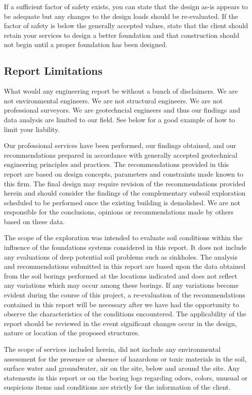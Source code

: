 \documentclass[12pt]{article}
\begin{document}
If a sufficient factor of safety exists, you can state that the design as-is appears to be adequate but any changes to the design loads should be re-evaluated. If the factor of safety is below the generally accepted values, state that the client should retain your services to design a better foundation and that construction should not begin until a proper foundation has been designed.

\subsection{Report Limitations}
What would any engineering report be without a bunch of disclaimers. We are not environmental engineers. We are not structural engineers. We are not professional surveyors. We are geotechncial engineers and thus our findings and data analysis are limited to our field. See below for a good example of how to limit your liability.

\begin{letter}
Our professional services have been performed, our findings obtained, and our recommendations prepared in accordance with generally accepted geotechnical engineering principles and practices.  The recommendations provided in this report are based on design concepts, parameters and constraints made known to this firm.  The final design may require revision of the recommendations provided herein and should consider the findings of the complementary subsoil exploration scheduled to be performed once the existing building is demolished.  We are not responsible for the conclusions, opinions or recommendations made by others based on these data.

The scope of the exploration was intended to evaluate soil conditions within the influence of the foundations systems considered in this report. It does not include any evaluations of deep potential soil problems such as sinkholes.  The analysis and recommendations submitted in this report are based upon the data obtained from the soil borings performed at the locations indicated and does not reflect any variations which may occur among these borings.  If any variations become evident during the course of this project, a re-evaluation of the recommendations contained in this report will be necessary after we have had the opportunity to observe the characteristics of the conditions encountered.  The applicability of the report should be reviewed in the event significant changes occur in the design, nature or location of the proposed structures.

The scope of services included herein, did not include any environmental assessment for the presence or absence of hazardous or toxic materials in the soil, surface water and groundwater, air on the site, below and around the site.  Any statements in this report or on the boring logs regarding odors, colors, unusual or suspicious items and conditions are strictly for the information of the client.
\end{letter}
\end{document}
